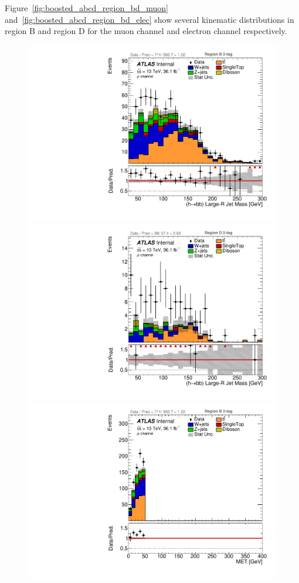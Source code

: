 Figure~\ref{fig:boosted_abcd_region_bd_muon} and~\ref{fig:boosted_abcd_region_bd_elec} show several kinematic distributions
in region B and region D for the muon channel and electron channel respectively.

\begin{figure}[!htbp]
\begin{center}
\includegraphics[scale=0.23]{./figures/boosted/ABCD/muon_Inc_RegionB_HbbMass}
\includegraphics[scale=0.23]{./figures/boosted/ABCD/muon_Inc_RegionD_HbbMass}\\
\includegraphics[scale=0.23]{./figures/boosted/ABCD/muon_Inc_RegionB_MET}

\end{center}
\end{figure}
